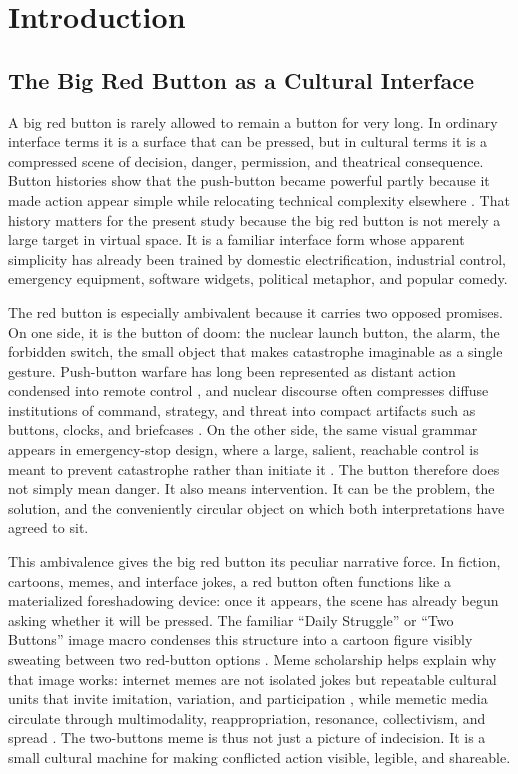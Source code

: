 \section{Introduction}

\subsection{The Big Red Button as a Cultural Interface}

A big red button is rarely allowed to remain a button for very long. In ordinary interface terms it is a surface that can be pressed, but in cultural terms it is a compressed scene of decision, danger, permission, and theatrical consequence. Button histories show that the push-button became powerful partly because it made action appear simple while relocating technical complexity elsewhere \citep{Plotnick2018}. That history matters for the present study because the big red button is not merely a large target in virtual space. It is a familiar interface form whose apparent simplicity has already been trained by domestic electrification, industrial control, emergency equipment, software widgets, political metaphor, and popular comedy.

The red button is especially ambivalent because it carries two opposed promises. On one side, it is the button of doom: the nuclear launch button, the alarm, the forbidden switch, the small object that makes catastrophe imaginable as a single gesture. Push-button warfare has long been represented as distant action condensed into remote control \citep{PlotnickWarfare2012}, and nuclear discourse often compresses diffuse institutions of command, strategy, and threat into compact artifacts such as buttons, clocks, and briefcases \citep{Taylor2007NuclearDiscourse,Cheek2025ApocalypticTechnicalCommunication}. On the other side, the same visual grammar appears in emergency-stop design, where a large, salient, reachable control is meant to prevent catastrophe rather than initiate it \citep{Kwon1996EmergencyStop}. The button therefore does not simply mean danger. It also means intervention. It can be the problem, the solution, and the conveniently circular object on which both interpretations have agreed to sit.

This ambivalence gives the big red button its peculiar narrative force. In fiction, cartoons, memes, and interface jokes, a red button often functions like a materialized foreshadowing device: once it appears, the scene has already begun asking whether it will be pressed. The familiar ``Daily Struggle'' or ``Two Buttons'' image macro condenses this structure into a cartoon figure visibly sweating between two red-button options \citep{DailyStruggleKnowYourMeme}. Meme scholarship helps explain why that image works: internet memes are not isolated jokes but repeatable cultural units that invite imitation, variation, and participation \citep{Shifman2013Memes}, while memetic media circulate through multimodality, reappropriation, resonance, collectivism, and spread \citep{Milner2016WorldMadeMeme}. The two-buttons meme is thus not just a picture of indecision. It is a small cultural machine for making conflicted action visible, legible, and shareable.

